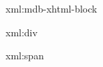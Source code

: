 
\startxmlsetups xml:mdb-xhtml-block
\stopxmlsetups


\startxmlsetups xml:div
\stopxmlsetups

\startxmlsetups xml:span
\stopxmlsetups

